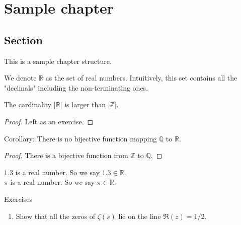 \documentclass[11pt,openany]{book}
\newcommand{\exercisename}{Exercises}
\newcommand{\definition}[2]{\begin{tcolorbox}[title=Definition ({#1}),colframe=black]{#2}\end{tcolorbox}
}
\newcommand{\theorem}[2]{\begin{tcolorbox}[title=Theorem ({#1}),colframe=red!70!black,colback=red!5!white]{#2}\end{tcolorbox}
}
\newcommand{\example}[1]{\begin{tcolorbox}[title=Example,colframe=yellow!50!white,colback=yellow!20!white,coltitle=black]{#1}\end{tcolorbox}
}
\newcommand{\corollary}[1]{\begin{tcolorbox}[]{Corollary: {#1}}\end{tcolorbox}
}
\begin{document}
	\chapter*{Sample chapter}
	\section*{Section}
	This is a sample chapter structure.\\
	\definition{Real numbers}{
		We denote $\mathbb{R}$ as the set of real numbers. Intuitively, this set contains all the "decimals" including the non-terminating ones.
	}
	\theorem{Cantor}{
		The cardinality $|\mathbb{R}|$ is larger than $|\mathbb{Z}|$.
	}
	\begin{proof}
		Left as an exercise.
	\end{proof}
	\corollary{
		There is no bijective function mapping $\mathbb{Q}$ to $\mathbb{R}$.
	}
	\begin{proof}
		There is a bijective function from $\mathbb{Z}$ to $\mathbb{Q}$.
	\end{proof}
	\example{
		$1.3$ is a real number. So we say $1.3 \in \mathbb{R}$. \\
		$\pi$ is a real number. So we say $\pi \in \mathbb{R}$.
	}

	\exercisename

	\begin{enumerate}
		\item Show that all the zeros of $\zeta(s)$ lie on the line $\Re (z)=1/2$.
	\end{enumerate}
	
\end{document}
